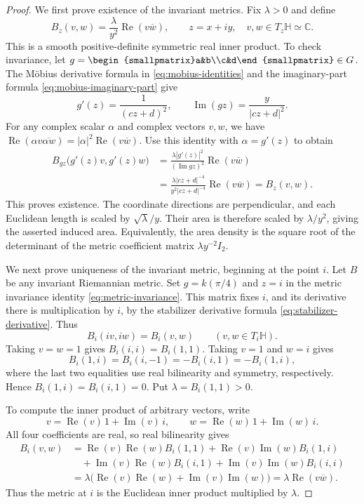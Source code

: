 \begin{proof}
We first prove existence of the invariant metrics. Fix $\lambda>0$ and define
\[
 B_z(v,w)=\frac{\lambda}{y^2}\operatorname{Re}(v\overline w),
 \qquad z=x+iy,\quad v,w\in T_z\mathbb H\simeq\mathbb C.
\]
This is a smooth positive-definite symmetric real inner product. To check invariance, let $g=\begin{smallpmatrix}a&b\\c&d\end{smallpmatrix}\in G$. The Möbius derivative formula in \eqref{eq:mobius-identities} and the imaginary-part formula \eqref{eq:mobius-imaginary-part} give
\[
 g'(z)=\frac1{(cz+d)^2},\qquad
 \operatorname{Im}(gz)=\frac{y}{|cz+d|^2}.
\]
For any complex scalar $\alpha$ and complex vectors $v,w$, we have
$\operatorname{Re}(\alpha v\overline{\alpha w})=|\alpha|^2\operatorname{Re}(v\overline w)$. Use this identity with $\alpha=g'(z)$ to obtain
\[
 \begin{aligned}
 B_{gz}\bigl(g'(z)v,g'(z)w\bigr)
 &=\frac{\lambda|g'(z)|^2}{(\operatorname{Im}gz)^2}
       \operatorname{Re}(v\overline w)\\
 &=\frac{\lambda|cz+d|^{-4}}{y^2|cz+d|^{-4}}
       \operatorname{Re}(v\overline w)
 =B_z(v,w).
 \end{aligned}
\]
This proves existence. The coordinate directions are perpendicular, and each Euclidean length is scaled by $\sqrt\lambda/y$. Their area is therefore scaled by $\lambda/y^2$, giving the asserted induced area. Equivalently, the area density is the square root of the determinant of the metric coefficient matrix $\lambda y^{-2}I_2$.

We next prove uniqueness of the invariant metric, beginning at the point $i$. Let $B$ be any invariant Riemannian metric. Set $g=k(\pi/4)$ and $z=i$ in the metric invariance identity \eqref{eq:metric-invariance}. This matrix fixes $i$, and its derivative there is multiplication by $i$, by the stabilizer derivative formula \eqref{eq:stabilizer-derivative}. Thus
\[
 B_i(iv,iw)=B_i(v,w)\qquad(v,w\in T_i\mathbb H).
\]
Taking $v=w=1$ gives $B_i(i,i)=B_i(1,1)$. Taking $v=1$ and $w=i$ gives
\[
 B_i(1,i)=B_i(i,-1)=-B_i(i,1)=-B_i(1,i),
\]
where the last two equalities use real bilinearity and symmetry, respectively. Hence $B_i(1,i)=B_i(i,1)=0$. Put $\lambda=B_i(1,1)>0$.

To compute the inner product of arbitrary vectors, write
\[
 v=\operatorname{Re}(v)\,1+\operatorname{Im}(v)\,i,
 \qquad w=\operatorname{Re}(w)\,1+\operatorname{Im}(w)\,i.
\]
All four coefficients are real, so real bilinearity gives
\[
 \begin{aligned}
 B_i(v,w)
 &=\operatorname{Re}(v)\operatorname{Re}(w)B_i(1,1)
   +\operatorname{Re}(v)\operatorname{Im}(w)B_i(1,i)\\
 &\quad+\operatorname{Im}(v)\operatorname{Re}(w)B_i(i,1)
   +\operatorname{Im}(v)\operatorname{Im}(w)B_i(i,i)\\
 &=\lambda\bigl(\operatorname{Re}(v)\operatorname{Re}(w)
                 +\operatorname{Im}(v)\operatorname{Im}(w)\bigr)
 =\lambda\operatorname{Re}(v\overline w).
 \end{aligned}
\]
Thus the metric at $i$ is the Euclidean inner product multiplied by $\lambda$.


\end{proof}
